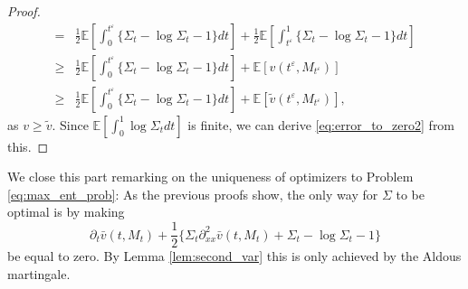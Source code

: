 \documentclass[reqno, a4paper]{amsart}
\theoremstyle{remark}
\newcommand{\1}{\mathbbm 1}
\renewcommand{\epsilon}{\varepsilon}
\numberwithin{equation}{section}
\numberwithin{theorem}{section}
\newcommand{\vo}{\bar{v}}
\begin{document}
\begin{proof}
\begin{align*}
=& \frac{1}{2}\mathbb E\left [\int_0^{t^\epsilon}\{\Sigma_t - \log\Sigma_t -1\} dt\right ] +\frac{1}{2}\mathbb E\left [\int_{t^\epsilon}^1\{\Sigma_t - \log\Sigma_t -1\} dt\right ] 	
\\ \geq & \frac{1}{2}\mathbb E\left [\int_0^{t^\epsilon}\{\Sigma_t - \log\Sigma_t -1\} dt\right ] + \mathbb E[v(t^\epsilon,M_{t^\epsilon})] \\
\geq & \frac{1}{2}\mathbb E\left [\int_0^{t^\epsilon}\{\Sigma_t - \log\Sigma_t -1\} dt\right ] + \mathbb E[\tilde v(t^\epsilon,M_{t^\epsilon})],
\end{align*}
as $v\geq \tilde v$. Since $\mathbb E[\int_0^1\log \Sigma_t dt]$ is finite, we can derive \eqref{eq:error_to_zero2} from this.
\end{proof}

We close this part remarking on the uniqueness of optimizers to Problem \eqref{eq:max_ent_prob}: As the previous proofs show, the only way for $\Sigma$ to be optimal is by making \[\partial_t \vo(t,M_t)+ \frac{1}{2} \{\Sigma_t \partial^2_{xx}\vo(t,M_t)+\Sigma_t -\log\Sigma_t-1\} \]
be equal to zero.  By Lemma \ref{lem:second_var} this is only achieved by the Aldous martingale.
\end{document}
